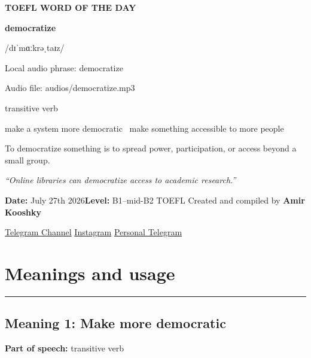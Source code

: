 \documentclass[11pt]{article}
\newcommand{\sectionrule}{\par\vspace{-0.5em}\noindent\textcolor{Accent}{\rule{\linewidth}{0.6pt}}\par}
\begin{document}
\begin{center}
{\sffamily\bfseries\color{Accent} TOEFL WORD OF THE DAY\par}
\vspace{8mm}
{\fontsize{42}{48}\selectfont\bfseries democratize\par}
\vspace{2mm}
{\Large\sffamily\color{Accent} /dɪˈmɑːkrəˌtaɪz/\par}
\vspace{2mm}
{\small\sffamily Local audio phrase: democratize\par}
{\small\sffamily Audio file: audios/democratize.mp3\par}
\vspace{2mm}
{\large\sffamily\color{Muted} transitive verb\par}
\vspace{5mm}
{\sffamily make a system more democratic \textbullet\ make something accessible to more people\par}
\vspace{6mm}
{\large To democratize something is to spread power, participation, or access beyond a small group.\par}
\vspace{6mm}
\begin{minipage}{0.84\textwidth}
\itshape “Online libraries can democratize access to academic research.”
\end{minipage}\par
\vspace{10mm}
\textbf{Date:} July 27th 2026\quad\textbullet\quad \textbf{Level:} B1--mid-B2 TOEFL
\vfill
Created and compiled by \textbf{Amir Kooshky}\par
\vspace{2mm}
\href{https://t.me/KooshkyTOEFL}{Telegram Channel}\quad\textbullet\quad
\href{https://www.instagram.com/kooshkytoefl}{Instagram}\quad\textbullet\quad
\href{https://t.me/KooshkyTOEFL\_pv}{Personal Telegram}
\end{center}
\newpage
\tableofcontents
\newpage

\section{Meanings and usage}
\sectionrule
\subsection{Meaning 1: Make more democratic}
\textbf{Part of speech:} transitive verb
\end{document}
